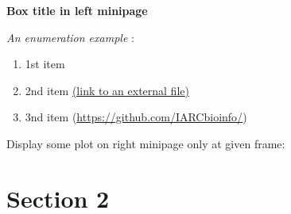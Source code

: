 \documentclass[compress]{beamer}
\begin{document}
\begin{frame}

\begin{minipage}{0.45\linewidth}
\begin{beamerboxesrounded}[scheme=beige,shadow=true]{\textbf{Box title in left minipage} }

\begin{footnotesize}
\textit{An enumeration example} \citep{bob2017}:
\begin{enumerate}
\item 1st item \hyperlink{SI1}{}
\item 2nd item \href{run:example.txt}{(link to an external file)} 
\item 3nd item (\url{https://github.com/IARCbioinfo/})
\end{enumerate}
\end{footnotesize}
\end{beamerboxesrounded}

\end{minipage}
\hspace*{3mm}
\begin{minipage}{0.50\linewidth}
Display some plot on right minipage only at given frame:


\end{minipage}

\end{frame}


\section{Section 2}
\end{document}

